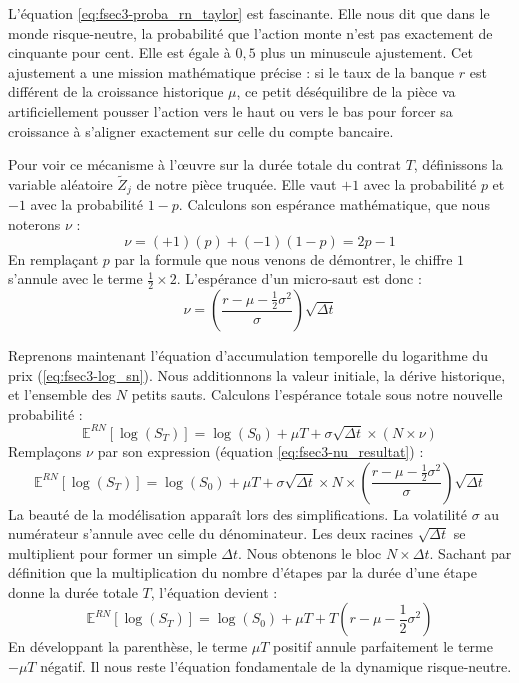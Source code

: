 L'équation \ref{eq:fsec3-proba_rn_taylor} est fascinante. Elle nous dit que dans le monde risque-neutre, la probabilité que l'action monte n'est pas exactement de cinquante pour cent. Elle est égale à $0,5$ plus un minuscule ajustement. 
Cet ajustement a une mission mathématique précise : si le taux de la banque $r$ est différent de la croissance historique $\mu$, ce petit déséquilibre de la pièce va artificiellement pousser l'action vers le haut ou vers le bas pour forcer sa croissance à s'aligner exactement sur celle du compte bancaire.

Pour voir ce mécanisme à l'œuvre sur la durée totale du contrat $T$, définissons la variable aléatoire $\tilde{Z}_j$ de notre pièce truquée. Elle vaut $+1$ avec la probabilité $p$ et $-1$ avec la probabilité $1-p$.
Calculons son espérance mathématique, que nous noterons $\nu$ :
\begin{equation}
    \label{eq:fsec3-esperance_zj}
    \nu = (+1)(p) + (-1)(1-p) = 2p - 1
\end{equation}
En remplaçant $p$ par la formule que nous venons de démontrer, le chiffre $1$ s'annule avec le terme $\frac{1}{2} \times 2$. L'espérance d'un micro-saut est donc :
\begin{equation}
    \label{eq:fsec3-nu_resultat}
    \nu = \left( \frac{r - \mu - \frac{1}{2}\sigma^2}{\sigma} \right) \sqrt{\Delta t}
\end{equation}

Reprenons maintenant l'équation d'accumulation temporelle du logarithme du prix (\ref{eq:fsec3-log_sn}). Nous additionnons la valeur initiale, la dérive historique, et l'ensemble des $N$ petits sauts. Calculons l'espérance totale sous notre nouvelle probabilité :
\begin{equation}
    \label{eq:fsec3-esperance_somme_log}
    \mathbb{E}^{RN}[\log(S_T)] = \log(S_0) + \mu T + \sigma \sqrt{\Delta t} \times (N \times \nu)
\end{equation}
Remplaçons $\nu$ par son expression (équation \ref{eq:fsec3-nu_resultat}) :
\begin{equation}
    \label{eq:fsec3-calcul_drift_etape1}
    \mathbb{E}^{RN}[\log(S_T)] = \log(S_0) + \mu T + \sigma \sqrt{\Delta t} \times N \times \left( \frac{r - \mu - \frac{1}{2}\sigma^2}{\sigma} \right) \sqrt{\Delta t}
\end{equation}
La beauté de la modélisation apparaît lors des simplifications. La volatilité $\sigma$ au numérateur s'annule avec celle du dénominateur. Les deux racines $\sqrt{\Delta t}$ se multiplient pour former un simple $\Delta t$. Nous obtenons le bloc $N \times \Delta t$. Sachant par définition que la multiplication du nombre d'étapes par la durée d'une étape donne la durée totale $T$, l'équation devient :
\begin{equation}
    \label{eq:fsec3-calcul_drift_etape2}
    \mathbb{E}^{RN}[\log(S_T)] = \log(S_0) + \mu T + T \left( r - \mu - \frac{1}{2}\sigma^2 \right)
\end{equation}
En développant la parenthèse, le terme $\mu T$ positif annule parfaitement le terme $-\mu T$ négatif. Il nous reste l'équation fondamentale de la dynamique risque-neutre.

